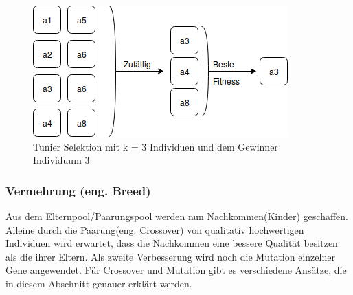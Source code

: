 \begin{itemize}
\begin{figure}[htb]
  \centering  
  \includegraphics[scale=0.6]{img/Tunier.png}
  \caption{Tunier Selektion mit k = 3 Individuen und dem Gewinner Individuum 3}
  \label{fig:roulette_wheel}
\end{figure}


\end{itemize}


\subsubsection{Vermehrung (eng. Breed)}
Aus dem Elternpool/Paarungspool werden nun Nachkommen(Kinder) geschaffen. Alleine durch die Paarung(eng. Crossover) von qualitativ hochwertigen Individuen wird erwartet, dass die Nachkommen eine bessere Qualität besitzen als die ihrer Eltern. Als zweite Verbesserung wird noch die Mutation einzelner Gene angewendet. Für Crossover und Mutation gibt es verschiedene Ansätze, die in diesem Abschnitt genauer erklärt werden.

